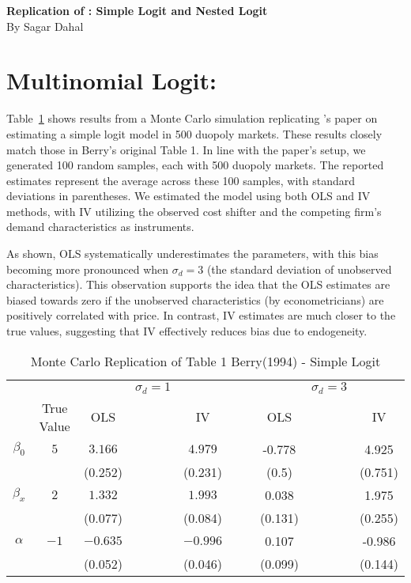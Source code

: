 \documentclass[12pt]{article}
\begin{document}
\begin{center}
  \large \textbf{Replication of \textcite{berry1994}: Simple Logit and Nested Logit} \\ \vspace{2mm}
  \large By Sagar Dahal \\
\end{center}

\section{Multinomial Logit:}
Table~\ref{tab1} shows results from a Monte Carlo simulation replicating \textcite{berry1994}'s paper on estimating a simple logit model in 500 duopoly markets. These results closely match those in Berry's original Table 1. In line with the paper's setup, we generated 100 random samples, each with 500 duopoly markets. The reported estimates represent the average across these 100 samples, with standard deviations in parentheses. We estimated the model using both OLS and IV methods, with IV utilizing the observed cost shifter and the competing firm's demand characteristics as instruments.

As shown, OLS systematically underestimates the parameters, with this bias becoming more pronounced when $\sigma_d = 3$ (the standard deviation of unobserved characteristics). This observation supports the idea that the OLS estimates are biased towards zero if the unobserved characteristics (by econometricians) are positively correlated with price. In contrast, IV estimates are much closer to the true values, suggesting that IV effectively reduces bias due to endogeneity. 

\begin{table}[H]
    \centering
    \begin{tabular}{cccccccccc}
        \hline
        &            &     & $\sigma_d = 1$ &  & & & & $\sigma_d = 3$\\
        \hdashline
        & True Value & OLS & & IV & & & OLS & & IV \\
        \hline
        $\beta_0$ & $5$ & $3.166$ &  & $4.979$  & & & -0.778 & & 4.925\\
                  &     & (0.252) &  & (0.231) & & & (0.5) & & (0.751) \\
        $\beta_x$ & $2$ & $1.332$ &  & $1.993$ & & & 0.038 & & 1.975\\
                  &     & (0.077) &  & (0.084) & & & (0.131) & & (0.255)\\
        $\alpha$ & $-1$ & $-0.635$ &  & $-0.996$ & & & 0.107 & & -0.986\\
                &       & (0.052)  &  & (0.046) & &  & (0.099) & & (0.144) \\
        \hline
        \end{tabular}
    \caption{Monte Carlo Replication of Table 1 Berry(1994) - Simple Logit}
    \label{tab1}
\end{table}
\end{document}
